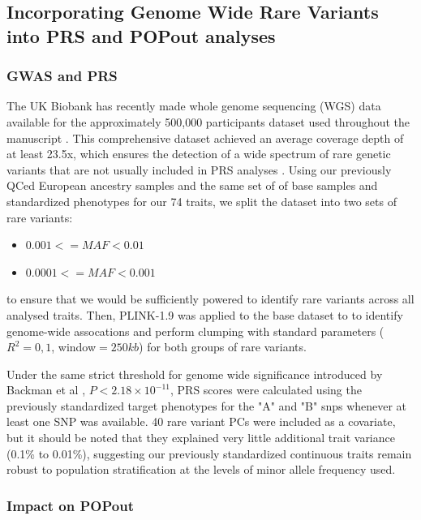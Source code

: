 \documentclass[12pt]{zHenriquesLab-StyleBioRxiv}
\begin{document}
{{{\color{red} 
\subsection*{Incorporating Genome Wide Rare Variants into PRS and POPout analyses} \label{sec:methods:rareVariants}

\subsubsection*{GWAS and PRS}

The UK Biobank has recently made whole genome sequencing (WGS) data available for the
approximately 500,000 participants dataset used throughout the manuscript \cite{ukb, ukb3}.  This
comprehensive dataset achieved an average coverage depth of at least 23.5x, which ensures
the detection of a wide spectrum of rare genetic variants that are not usually included in
PRS analyses \cite{ukb2}.  Using our previously QCed European ancestry samples and the
same set of of base samples and standardized phenotypes for our 74 traits, we split the
dataset into two sets of rare variants:

\begin{itemize}
    \item[\textbf{A:}] $0.001 <= MAF < 0.01$
    \item[\textbf{B:}] $0.0001 <= MAF < 0.001$
\end{itemize}

to ensure that we would be sufficiently powered to identify rare variants across
all analysed traits.  Then, PLINK-1.9 \cite{plink, bt_10} was applied to the base dataset
to to identify genome-wide assocations and perform clumping with standard
parameters ($R^2=0,1$, window$=250kb$) \cite{Choi2020} for both groups of rare variants.

Under the same strict threshold for genome wide significance introduced
by Backman et al \cite{Backman2021}, $P<2.18 \times 10^{-11}$, PRS scores
were calculated using the previously standardized target phenotypes for
the "A" and "B" snps whenever at least one SNP was available.  40 rare variant PCs
were included as a covariate, but it should be noted that they explained very
little additional trait variance (0.1\% to 0.01\%), suggesting our previously
standardized continuous traits remain robust to population stratification
at the levels of minor allele frequency used.

\subsubsection*{Impact on POPout}

}}}
\end{document}
